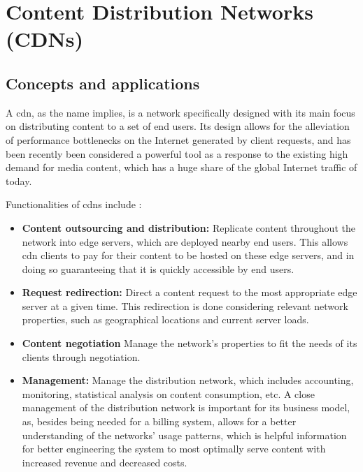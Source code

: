 \section{Content Distribution Networks (CDNs)}

\subsection{Concepts and applications}

\label{ssec:cdn-concepts}

   A \gls{cdn}, as the name implies, is a network specifically designed with its main focus on distributing content to a set of end users.
   Its design allows for the alleviation of performance bottlenecks on the Internet generated by client requests, and has been recently been considered a powerful tool as a response to the existing high demand for media content, which has a huge share of the global Internet traffic of today.

   Functionalities of \glspl{cdn} include \cite{cdn-survey}:

    \begin{itemize}
        \item \textbf{Content outsourcing and distribution:} Replicate content throughout the network into edge servers, which are deployed nearby end users.
            This allows \gls{cdn} clients to pay for their content to be hosted on these edge servers, and in doing so guaranteeing that it is quickly accessible by end users.
        \item \textbf{Request redirection:} Direct a content request to the most appropriate edge server at a given time.
            This redirection is done considering relevant network properties, such as geographical locations and current server loads.
        \item \textbf{Content negotiation} Manage the network's properties to fit the needs of its clients through negotiation.
        \item \textbf{Management:} Manage the distribution network, which includes accounting, monitoring, statistical analysis on content consumption, etc.
            A close management of the distribution network is important for its business model, as, besides being needed for a billing system, allows for a better understanding of the networks' usage patterns, which is helpful information for better engineering the system to most optimally serve content with increased revenue and decreased costs.
    \end{itemize}

